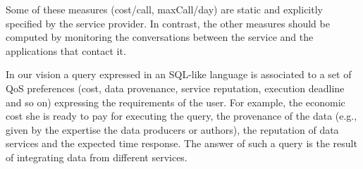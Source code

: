 

Some of these measures ({\sf cost/call, maxCall/day}) are static and explicitly specified by the service provider. 
In contrast, the other measures should be computed by monitoring the conversations between the service and the applications that contact it.  

In our vision a query expressed in an SQL-like language is associated to a set of QoS preferences (cost, data provenance, service reputation, execution deadline and so on) expressing the requirements of the user. For example, the economic cost she is ready to pay for executing the query, the provenance of the data (e.g., given by the expertise the data producers or authors), the reputation of data services and the expected time response. The answer of such a query is the result of integrating data from different services.

